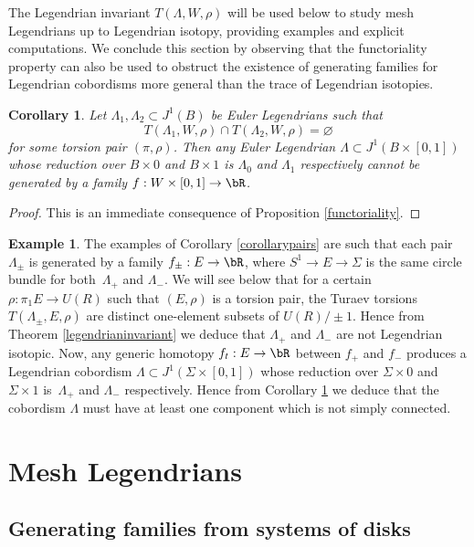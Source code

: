 \documentclass[JEP,XML,SOM,Unicode,NoFloatCountersInSection]{cedram}
\theoremstyle{plain}
\newtheorem{corollary}[theorem]{Corollary}
\theoremstyle{definition}
\newtheorem{example}[theorem]{Example}
\begin{document}
The Legendrian invariant $T(\Lambda, W, \rho)$ will be used below to study mesh Legendrians up to Legendrian isotopy, providing examples and explicit computations. We conclude this section by observing that the functoriality property can also be used to obstruct the existence of generating families for Legendrian cobordisms more general than the trace of Legendrian isotopies.

\begin{corollary}\label{cobordism}
Let $\Lambda_1, \Lambda_2 \subset J^1(B)$ be Euler Legendrians such that
\[
T(\Lambda_1,W,\rho) \cap T(\Lambda_2, W, \rho) = \varnothing
\]
for some torsion pair $(\pi, \rho)$. Then any Euler Legendrian $\Lambda \subset J^1(B \times [0,1])$ whose reduction over $B \times 0$ and $B \times 1$ is $\Lambda_0$ and $\Lambda_1$ respectively cannot be generated by a family $f:W \times [0,1]\to \bR$.
\end{corollary}

\begin{proof} This is an immediate consequence of Proposition \ref{functoriality}. \end{proof}

\begin{example}
The examples of Corollary \ref{corollarypairs} are such that each pair $\Lambda_\pm$ is generated by a family $f_\pm : E \to \bR$, where $S^1 \to E \to \Sigma$ is the same circle bundle for both~$\Lambda_+$ and $\Lambda_-$. We will see below that for a certain $\rho: \pi_1E \to U(R)$ such that $(E,\rho)$ is a torsion pair, the Turaev torsions $T(\Lambda_\pm, E, \rho)$ are distinct one-element subsets of $U(R) / \pm 1$. Hence from Theorem \ref{legendrianinvariant} we deduce that $\Lambda_+$ and $\Lambda_-$ are not Legendrian isotopic. Now, any generic homotopy $f_t:E \to \bR$ between $f_+$ and $f_-$ produces a Legendrian cobordism $\Lambda \subset J^1(\Sigma \times [0,1])$ whose reduction over $\Sigma \times 0$ and $\Sigma \times 1$ is~$\Lambda_+$ and $\Lambda_-$ respectively. Hence from Corollary \ref{cobordism} we deduce that the cobordism $\Lambda$ must have at least one component which is not simply connected.
\end{example}

\section{Mesh Legendrians}\label{Section: mesh Legendrians}

\subsection{Generating families from systems of disks}\label{systems of disks}
\end{document}
